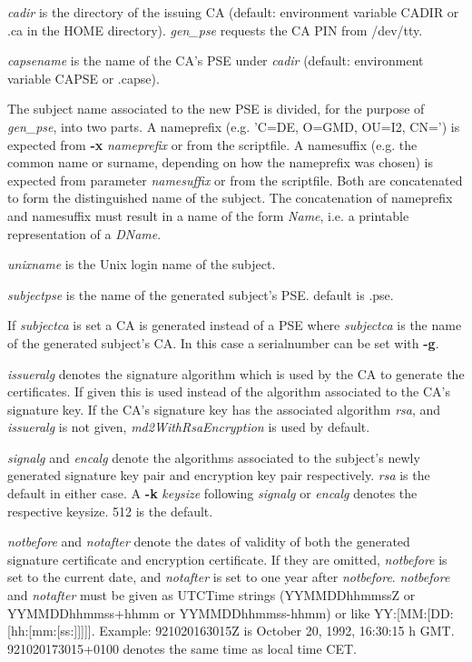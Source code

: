 {\em cadir} is the directory of the issuing CA (default: environment variable CADIR or .ca in the HOME
directory).
{\em gen\_pse} requests the CA PIN from /dev/tty.

{\em capsename} is the name of the CA's PSE under {\em cadir} (default: environment variable CAPSE or .capse).

The subject name associated to the new PSE is divided, for the purpose of {\em gen\_pse}, 
into two parts. A nameprefix (e.g. 'C=DE, O=GMD, OU=I2, CN=') is expected from
{\bf -x} {\em nameprefix} or from the scriptfile. A namesuffix (e.g. the common name
or surname, depending on how the nameprefix was chosen) is expected from parameter
{\em namesuffix} or from the scriptfile. Both are concatenated to form the distinguished
name of the subject. The concatenation of nameprefix and namesuffix must result in a name
of the form {\em Name}, i.e. a printable representation of a {\em DName}.

{\em unixname} is the Unix login name of the subject.

{\em subjectpse} is the name of the generated subject's PSE. default is .pse.

If {\em subjectca} is set a CA is generated instead of a PSE where {\em subjectca}
is the name of the generated subject's CA.
In this case a serialnumber can be set with {\bf -g}.

{\em issueralg} denotes the signature algorithm  which is used by the CA to generate
the certificates. If given this is used instead of the algorithm associated to
the CA's signature key. If the CA's signature key has the associated algorithm {\em rsa},
and {\em issueralg} is not given, {\em md2WithRsaEncryption} is used by default.

{\em signalg} and {\em encalg} denote the algorithms associated to the subject's newly
generated signature key pair and encryption key pair respectively. {\em rsa} is the
default in either case. A {\bf -k} {\em keysize} following {\em signalg} or {\em encalg}
denotes the respective keysize. 512 is the default.

{\em notbefore} and {\em notafter} denote the dates of validity of both the generated
signature certificate and encryption certificate. If they are omitted, {\em notbefore} is
set to the current date, and {\em notafter} is set to one year after {\em notbefore}.
{\em notbefore} and {\em notafter} must be given as UTCTime strings (YYMMDDhhmmssZ
or YYMMDDhhmmss+hhmm or YYMMDDhhmmss-hhmm) or like YY:[MM:[DD:[hh:[mm:[ss:]]]]]. 
Example: 921020163015Z is October 20, 1992,
16:30:15 h GMT. 921020173015+0100 denotes the same time as local time CET.

